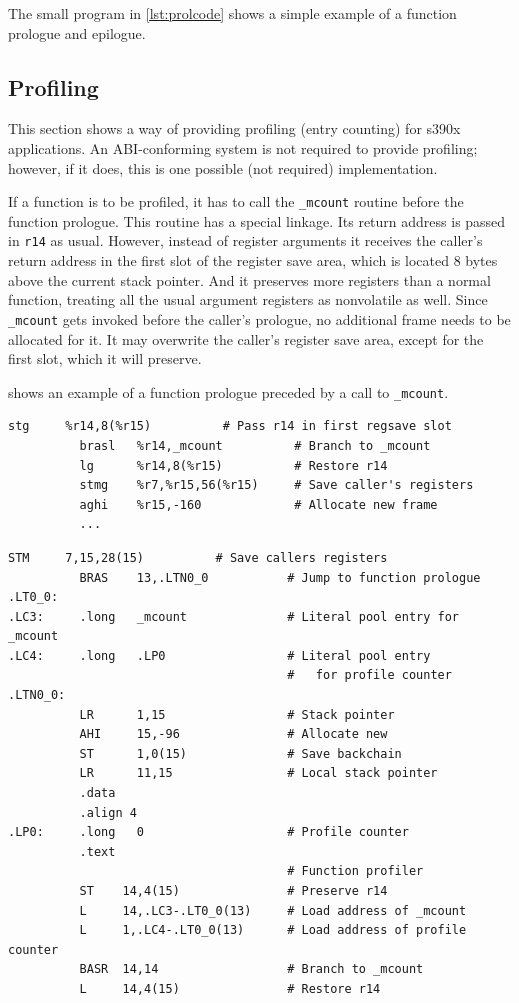 \documentclass[USenglish,fontsize=11pt,twoside,%
  toc=bib,toc=idx,toc=graduated,numbers=noendperiod,
  bookmarks=true,
  bookmarksnumbered=true,
  bookmarksopen=true,
  bookmarksopenlevel=1,
  breaklinks=true,
  colorlinks=true,
  linkcolor=black,
  pdfpagelayout={TwoPageRight},
  pdfusetitle=true
]{scrreprt}
\newcommand{\NBYTES}{8}
\newcommand{\ABINAME}{s390x}
\newcommand{\NBYTES}{4}
\newcommand{\ABINAME}{s390}
\begin{document}
The small program in \cref{lst:prolcode} shows a simple example of a
function prologue and epilogue.

\subsection{Profiling}
This section shows a way of providing profiling (entry counting) for
\ABINAME{} applications.  An ABI-conforming system is not required to
provide profiling; however, if it does, this is one possible (not
required) implementation.

If a function is to be profiled, it has to call the \texttt{\_mcount}
routine before the function prologue.  This routine has a special linkage.
Its return address is passed in \texttt{r14} as usual.  However, instead
of register arguments it receives the caller's return address in the first
slot of the register save area, which is located \NBYTES{} bytes above the
current stack pointer.  And it preserves more registers than a normal
function, treating all the usual argument registers as nonvolatile as
well.  Since \texttt{\_mcount} gets invoked before the caller's prologue,
no additional frame needs to be allocated for it.  It may overwrite the
caller's register save area, except for the first slot, which it will
preserve.

 shows an example of a function prologue preceded by a
call to \texttt{\_mcount}.

\ifzseries
\begin{lstlisting}[language=simpleasm,style=float,label=lst:profcode,
  caption=Code for profiling]
          stg     %r14,8(%r15)          # Pass r14 in first regsave slot
          brasl   %r14,_mcount          # Branch to _mcount
          lg      %r14,8(%r15)          # Restore r14
          stmg    %r7,%r15,56(%r15)     # Save caller's registers
          aghi    %r15,-160             # Allocate new frame
          ...
\end{lstlisting}
\else
\begin{lstlisting}[language=simpleasm,style=float,label=lst:profcode,
  caption=Code for profiling]
          STM     7,15,28(15)          # Save callers registers
          BRAS    13,.LTN0_0           # Jump to function prologue
.LT0_0:
.LC3:     .long   _mcount              # Literal pool entry for _mcount
.LC4:     .long   .LP0                 # Literal pool entry
                                       #   for profile counter
.LTN0_0:
          LR      1,15                 # Stack pointer
          AHI     15,-96               # Allocate new
          ST      1,0(15)              # Save backchain
          LR      11,15                # Local stack pointer
          .data
          .align 4
.LP0:     .long   0                    # Profile counter
          .text
                                       # Function profiler
          ST    14,4(15)               # Preserve r14
          L     14,.LC3-.LT0_0(13)     # Load address of _mcount
          L     1,.LC4-.LT0_0(13)      # Load address of profile counter
          BASR  14,14                  # Branch to _mcount
          L     14,4(15)               # Restore r14
\end{lstlisting}
\fi
\end{document}
